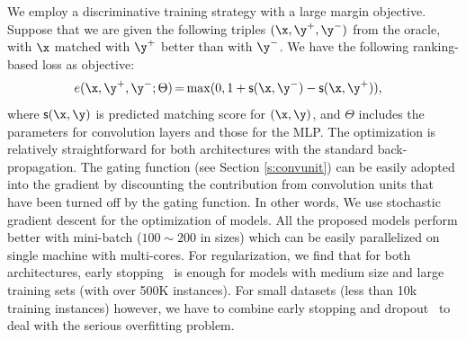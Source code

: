 \documentclass{article} %
\begin{document}
We employ a discriminative training strategy with a large margin objective. Suppose that we are given the following triples $(\x, \y^+, \y^-)$ from the oracle, with $\x$ matched with $\y^+$ better than with $\y^-$.  We have the following ranking-based loss as objective:
{\small
\[
e(\x, \y^+, \y^-; \Theta)\hspace{-1pt} = \hspace{-1pt}
\max(0, 1+\textsf{s}(\x,\y^-)-\textsf{s}(\x,\y^+)), \;\;\;%
\]}
where $\textsf{s}(\x,\y)$ is predicted matching score for $(\x,\y)$, and $\Theta$ includes the parameters for convolution layers and those for the MLP. The optimization is relatively straightforward for both architectures with the standard back-propagation. The gating function (see Section \ref{s:convunit}) can be easily adopted into the gradient by discounting the contribution from convolution units that have been turned off by the gating function. In other words,
We use stochastic gradient descent for the optimization of models.  All the proposed models perform better with mini-batch ($100\sim200$ in sizes) which can be easily parallelized on single machine with multi-cores.
For regularization, we find that for both architectures, early stopping~\cite{earlystoping} is enough for models with medium size and large training sets (with over 500K instances). For small datasets (less than 10k training instances) however, we have to combine early stopping and dropout~\cite{dropout} to deal with the serious overfitting problem. \hspace{-10pt}
\end{document}
